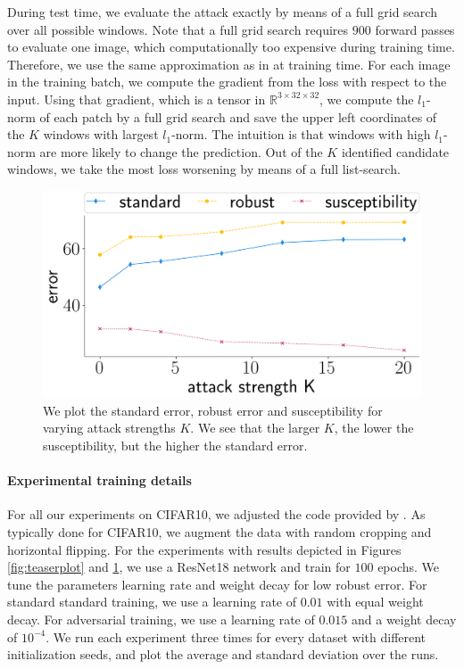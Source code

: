 During test time, we evaluate the attack exactly by means of a full grid search over all possible windows. Note that a full grid search requires $900$ forward passes to evaluate one image, which computationally too expensive during training time. Therefore, we use the same approximation as in \cite{Wu20} at training time. For each image in the training batch, we compute the gradient from the loss with respect to the input. Using that gradient, which is a tensor in $\mathbb{R}^{3 \times 32 \times 32}$, we compute the $l_1$-norm of each patch by a full grid search and save the upper left coordinates of the $K$ windows with largest $l_1$-norm. The intuition is that windows with high $l_1$-norm are more likely to change the prediction. Out of the $K$ identified candidate windows, we take the most loss worsening by means of a full list-search. 

\begin{figure}
\includegraphics[width=0.99\linewidth]{plotsAistats/K_plot_cifar.png}
\caption{We plot the standard error, robust error and susceptibility for varying attack strengths $K$. We see that the larger $K$, the lower the susceptibility, but the higher the standard error.}
\label{fig:K_plot}
\end{figure}

\paragraph{Experimental training details}
For all our experiments on CIFAR10, we adjusted the code provided by \cite{Phan21}. As typically done for CIFAR10, we augment the data with random cropping and horizontal flipping. For the experiments with results depicted in Figures \ref{fig:teaserplot} and \ref{fig:K_plot}, we use a ResNet18 network and train for $100$ epochs. We tune the parameters learning rate and weight decay for low robust error. For standard standard training, we use a learning rate of $0.01$ with equal weight decay. For adversarial training, we use a learning rate of $0.015$ and a weight decay of $10^{-4}$. We run each experiment three times for every dataset with different initialization seeds, and plot the average and standard deviation over the runs. 

